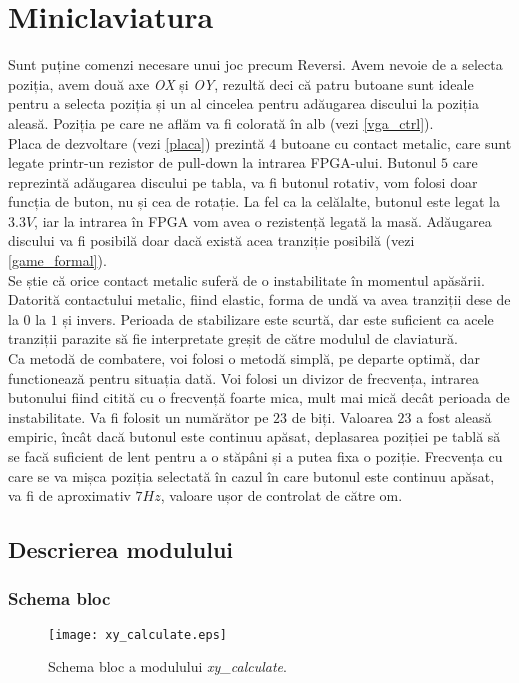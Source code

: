 \documentclass[12pt,twoside,a4paper,fleqn]{book}
\theoremstyle{definition}
\begin{document}
\section{Miniclaviatura}
\label{mini_klavier}
Sunt puține comenzi necesare unui joc precum Reversi. Avem nevoie de a selecta poziția, avem două axe \emph{OX} și \emph{OY}, rezultă deci că patru butoane sunt ideale pentru a selecta poziția și un al cincelea pentru adăugarea discului la poziția aleasă. Poziția pe care ne aflăm va fi colorată în alb (vezi \ref{vga_ctrl}).\\
Placa de dezvoltare (vezi \ref{placa}) prezintă $4$ butoane cu contact metalic, care sunt legate printr-un rezistor de pull-down la intrarea FPGA-ului. Butonul $5$ care reprezintă adăugarea discului pe tabla, va fi butonul rotativ, vom folosi doar funcția de buton, nu și cea de rotație. La fel ca la celălalte, butonul este legat la $3.3V$, iar la intrarea în FPGA vom avea o rezistență legată la masă. Adăugarea discului va fi posibilă doar dacă există acea tranziție posibilă (vezi \ref{game_formal}).\\
Se știe că orice contact metalic suferă de o instabilitate în momentul apăsării. Datorită contactului metalic, fiind elastic, forma de undă va avea tranziții dese de la $0$ la $1$ și invers. Perioada de stabilizare este scurtă, dar este suficient ca acele tranziții parazite să fie interpretate greșit de către modulul de claviatură.\\
Ca metodă de combatere,  voi folosi o metodă simplă, pe departe optimă, dar functionează pentru situația dată. Voi folosi un divizor de frecvența, intrarea butonului fiind citită cu o frecvență foarte mica, mult mai mică decât perioada de instabilitate. Va fi folosit un numărător pe $23$ de biți. Valoarea $23$ a fost aleasă empiric, încât dacă butonul este continuu apăsat, deplasarea poziției pe tablă să se facă suficient de lent pentru a o stăpâni și a putea fixa o poziție. Frecvența cu care se va mișca poziția selectată în cazul în care butonul este continuu apăsat, va fi de aproximativ $7Hz$, valoare ușor de controlat de către om.

\subsection{Descrierea modulului}
\subsubsection{Schema bloc}
\begin{figure}[h]
\texttt{[image: xy\_calculate.eps]}
\caption{\small{Schema bloc a modulului \emph{xy\_calculate}.}}
\label{fig:fig_xy_calculate}
\end{figure}
\end{document}
